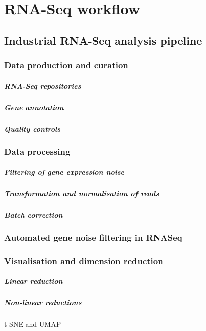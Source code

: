 \chapter{RNA-Seq workflow}
\label{chap:transcriptome-workflow}
\section{Industrial RNA-Seq analysis pipeline}

\subsection{Data production and curation}
\paragraph{RNA-Seq repositories}
\paragraph{Gene annotation}
\paragraph{Quality controls}

\subsection{Data processing}
\paragraph{Filtering of gene expression noise}
\paragraph{Transformation and normalisation of reads}
\paragraph{Batch correction}


\subsection{Automated gene noise filtering in RNASeq}

\subsection{Visualisation and dimension reduction}
\paragraph{Linear reduction}
\paragraph{Non-linear reductions}
t-SNE and UMAP

